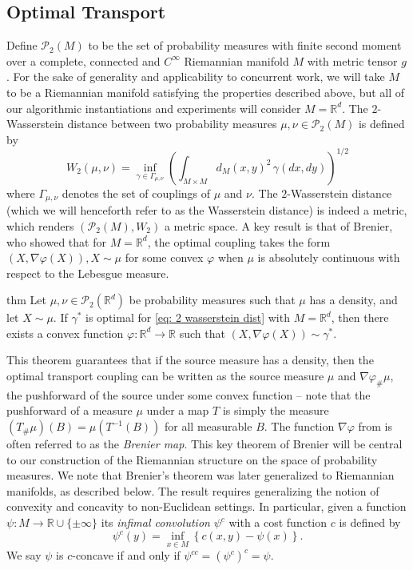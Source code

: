 \documentclass[11pt]{article}
\newcommand{\man}{M}
\begin{document}
\subsection{Optimal Transport} Define $\mathcal{P}_{2}(\man)$ to be the set of probability measures with finite second moment over a complete, connected and $C^{\infty}$ Riemannian manifold $\man$ with metric tensor $g$. For the sake of generality and applicability to concurrent work, we will take $\man$ to be a Riemannian manifold satisfying the properties described above, but all of our algorithmic instantiations and experiments will consider $\man = \mathbb{R}^d$. The $2$-Wasserstein distance between two probability measures $\mu, \nu \in \mathcal{P}_{2}(\man)$ is defined by
\begin{equation}
    W_2(\mu, \nu) = \inf_{\gamma \in \Gamma_{\mu, \nu}}\left(\int_{\man \times \man} d_M(x,y)^2\,\gamma(dx, dy)\right)^{1/2} \label{eq: 2 wasserstein dist}
\end{equation}
where $\Gamma_{\mu, \nu}$ denotes the set of couplings of $\mu$ and $\nu$. The $2$-Wasserstein distance (which we will henceforth refer to as the Wasserstein distance) is indeed a metric, which renders $(\mathcal{P}_{2}(\man), W_2)$ a metric space. A key result is that of Brenier, who showed that for $\man = \mathbb{R}^d$, the optimal coupling takes the form $(X, \nabla \varphi(X)), X \sim \mu$ for some convex $\varphi$ when $\mu$ is absolutely continuous with respect to the Lebesgue measure.

\begin{restatable}[Brenier]{thm}{} \label{brenier}
    Let $\mu, \nu \in \mathcal{P}_2(\mathbb{R}^d)$ be probability measures such that $\mu$ has a density, and let $X \sim \mu$. If $\gamma^*$ is optimal for \cref{eq: 2 wasserstein dist} with $\man = \mathbb{R}^d$, then there exists a convex function $\varphi:\mathbb{R}^d \rightarrow \mathbb{R}$ such that $(X, \nabla\varphi(X))\sim \gamma^*$. 
\end{restatable}

This theorem guarantees that if the source measure has a density, then the optimal transport coupling can be written as the source measure $\mu$ and $\nabla \varphi_\#\mu$, the pushforward of the source under some convex function -- note that the pushforward of a measure $\mu$ under a map $T$ is simply the measure $(T_\#\mu) (B) = \mu(T^{-1}(B))$ for all measurable $B$. The function $\nabla\varphi$ from  is often referred to as the \textit{Brenier map}. This key theorem of Brenier will be central to our construction of the Riemannian structure on the space of probability measures. We note that Brenier's theorem was later generalized to Riemannian manifolds, as described below. The result requires generalizing the notion of convexity and concavity to non-Euclidean settings. In particular, given a function $\psi: M \rightarrow \mathbb{R} \cup \{\pm \infty\}$ its \textit{infimal convolution} $\psi^c$ with a cost function $c$ is defined by 
\[\psi^c(y) = \inf_{x \in M}\left\{c(x,y) - \psi(x)\right\}.\]
We say $\psi$ is $c$-concave if and only if $\psi^{cc} = (\psi^c)^c = \psi.$
\end{document}
